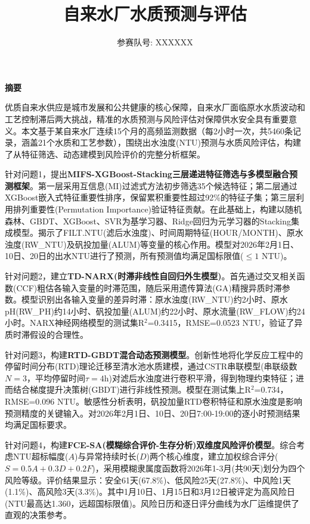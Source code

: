 \documentclass[12pt,a4paper]{ctexart}
\title{\textbf{\heiti\zihao{2} 自来水厂水质预测与评估}}
\author{\zihao{4} 参赛队号: XXXXXX}
\date{}
\begin{document}
\maketitle
\thispagestyle{empty}

\begin{center}
\heiti\textbf{摘\quad 要}
\end{center}

\noindent 优质自来水供应是城市发展和公共健康的核心保障，自来水厂面临原水水质波动和工艺控制滞后两大挑战，精准的水质预测与风险评估对保障供水安全具有重要意义。本文基于某自来水厂连续15个月的高频监测数据（每2小时一次，共5460条记录，涵盖21个水质和工艺参数），围绕出水浊度(NTU)预测与水质风险评估，构建了从特征筛选、动态建模到风险评价的完整分析框架。

针对问题1，提出\textbf{MIFS-XGBoost-Stacking三层递进特征筛选与多模型融合预测框架}。第一层采用互信息(MI)过滤式方法初步筛选35个候选特征；第二层通过XGBoost嵌入式特征重要性排序，保留累积重要性超过92\%的特征子集；第三层利用排列重要性(Permutation Importance)验证特征贡献。在此基础上，构建以随机森林、GBDT、XGBoost、SVR为基学习器、Ridge回归为元学习器的Stacking集成模型。揭示了FILT.NTU(滤后水浊度)、时间周期特征(HOUR/MONTH)、原水浊度(RW\_NTU)及矾投加量(ALUM)等变量的核心作用。模型对2026年2月1日、10日、20日的出水NTU进行了预测，所有预测值均满足国标限值($\leq 1$ NTU)。

针对问题2，建立\textbf{TD-NARX(时滞非线性自回归外生模型)}。首先通过交叉相关函数(CCF)粗估各输入变量的时滞范围，随后采用遗传算法(GA)精搜异质时滞参数。模型识别出各输入变量的差异时滞：原水浊度(RW\_NTU)约2小时、原水pH(RW\_PH)约14小时、矾投加量(ALUM)约22小时、原水流量(RW\_FLOW)约24小时。NARX神经网络模型的测试集R$^2$=0.3415，RMSE=0.0523 NTU，验证了异质时滞假设的合理性。

针对问题3，构建\textbf{RTD-GBDT混合动态预测模型}。创新性地将化学反应工程中的停留时间分布(RTD)理论迁移至清水池水质建模，通过CSTR串联模型(串联级数$N=3$，平均停留时间$\tau=4$h)对滤后水浊度进行卷积平滑，得到物理约束特征；进而结合梯度提升决策树(GBDT)进行非线性预测。模型在测试集上R$^2$=0.734，RMSE=0.096 NTU。敏感性分析表明，矾投加量RTD卷积特征和原水浊度是影响预测精度的关键输入。对2026年2月1日、10日、20日7:00-19:00的逐小时预测结果均满足国标要求。

针对问题4，构建\textbf{FCE-SA(模糊综合评价-生存分析)双维度风险评价模型}。综合考虑NTU超标幅度($A$)与异常持续时长($D$)两个核心维度，建立加权综合评分($S=0.5A+0.3D+0.2F$)，采用模糊隶属度函数将2026年1-3月(共90天)划分为四个风险等级。评价结果显示：安全61天(67.8\%)、低风险25天(27.8\%)、中风险1天(1.1\%)、高风险3天(3.3\%)。其中1月10日、1月15日和3月12日被评定为高风险日(NTU最高达1.360，远超国标限值)。风险日历和逐日评分曲线为水厂运维提供了直观的决策参考。
\end{document}
